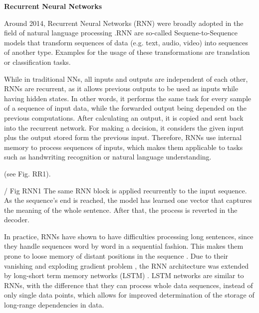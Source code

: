 \textbf{Recurrent Neural Networks}
    \label{sec:RNNs}

Around 2014, Recurrent Neural Networks (RNN) were broadly adopted in the field of natural language processing \cite{jozefowicz2016exploring}.RNN are so-called Sequene-to-Sequence models that transform sequences of data (e.g. text, audio, video) into sequences of another type. Examples for the usage of these transformations are translation or classification tasks.

While in traditional NNs, all inputs and outputs are independent of each other, RNNs are recurrent, as it allows previous outputs to be used as inputs while having hidden states. In other words, it performs the same task for every sample of a sequence of input data, while the forwarded output being depended on the previous computations.
After calculating an output, it is copied and sent back into the recurrent network. For making a decision, it considers the given input plus the output stored form the previous input.
Therefore, RNNs use internal memory to process sequences of inputs, which makes them applicable to tasks such as handwriting recognition or natural language understanding.

(see Fig. RR1).

/ Fig RNN1 The same RNN block is applied recurrently to the input sequence. As the sequence's end is reached, the model has learned one vector that captures the meaning of the whole sentence. After that, the process is reverted in the decoder.


In practice, RNNs have shown to have difficulties processing long sentences, since they handle sequences word by word in a sequential fashion. This makes them prone to loose memory of distant positions in the sequence \cite{mikolov2010recurrent}.
Due to their vanishing and exploding gradient problem \cite{pascanu2013difficulty}, the RNN architecture was extended by long-short term memory networks (LSTM) \cite{hochreiter1997long, graves2005framewise}. 
LSTM networks are similar to RNNs, with the difference that they can process whole data sequences, instead of only single data points, which allows for improved determination of the storage of long-range dependencies in data. 

